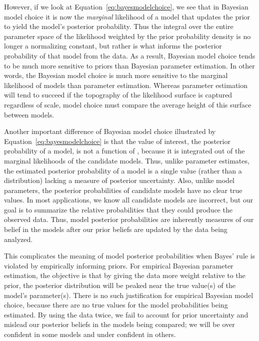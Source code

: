 
However, if we look at Equation~\ref{eq:bayesmodelchoice}, we see that in
Bayesian model choice it is now the \emph{marginal} likelihood of a model that
updates the prior to yield the model's posterior probability.
Thus the integral over the entire parameter space of the likelihood weighted by
the prior probability density is no longer a normalizing constant, but rather
is what informs the posterior probability of that model from the data.
As a result, Bayesian model choice tends to be much more sensitive to priors
than Bayesian parameter estimation.
In other words, the Bayesian model choice is much more sensitive to the marginal
likelihood of models than parameter estimation.
Whereas parameter estimation will tend to succeed if the topography of the
likelihood surface is captured regardless of scale, model choice must compare
the average height of this surface between models.

Another important difference of Bayesian model choice illustrated by
Equation~\ref{eq:bayesmodelchoice} is that the value of interest, the
posterior probability of a model, is not a function of \myTheta{}, because
it is integrated out of the marginal likelihoods of the candidate models.
Thus, unlike parameter estimates, the estimated posterior probability of a
model is a single value (rather than a distribution) lacking a measure of
posterior uncertainty.
Also, unlike model parameters, the posterior probabilities of candidate
models have no clear true values.
In most applications, we know all candidate models are incorrect, but our goal
is to summarize the relative probabilities that they could produce the observed
data.
Thus, model posterior probabilities are inherently measures of our belief in the
models after our prior beliefs are updated by the data being analyzed.

This complicates the meaning of model posterior probabilities when Bayes' rule
is violated by empirically informing priors.
For empirical Bayesian parameter estimation, the objective is that by giving the
data more weight relative to the prior, the posterior distribution will be
peaked near the true value(s) of the model's parameter(s).
There is no such justification for empirical Bayesian model choice, because
there are no true values for the model probabilities being estimated.
By using the data twice, we fail to account for prior uncertainty and mislead
our posterior beliefs in the models being compared; we will be over confident
in some models and under confident in others.


